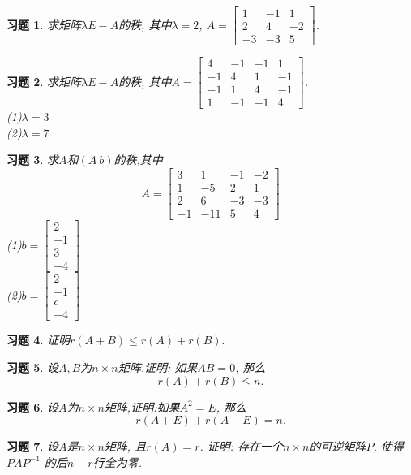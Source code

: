 \documentclass[a4paper]{book}
\newtheorem{ex}{习题}[chapter]
\begin{document}
\begin{ex}\label{4.21}
求矩阵$\lambda E-A$的秩, 其中$\lambda=2$, $A=\begin{bmatrix}1&-1&1\\2&4&-2\\-3&-3&5\end{bmatrix}$.
\end{ex}

\begin{ex}\label{4.22}
求矩阵$\lambda E-A$的秩, 其中$A=\begin{bmatrix}4&-1&-1&1\\-1&4&1&-1\\-1&1&4&-1\\1&-1&-1&4\end{bmatrix}$.\\
(1)$\lambda=3$\\
(2)$\lambda=7$
\end{ex}

\begin{ex}\label{4.23}
求$A$和$(A\ b)$的秩,其中
$$A=\begin{bmatrix}3&1&-1&-2\\1&-5&2&1\\2&6&-3&-3\\-1&-11&5&4\end{bmatrix}$$
(1)$b=\begin{bmatrix}2\\-1\\3\\-4\end{bmatrix}$ \\
(2)$b=\begin{bmatrix}2\\-1\\c\\-4\end{bmatrix}$
\end{ex}

\begin{ex}\label{4.24}
证明$r(A+B)\leq r(A)+r(B).$
\end{ex}

\begin{ex}\label{4.25}
设$A,B$为$n\times n$矩阵.证明: 如果$AB=0$, 那么$$r(A)+r(B)\leq n.$$
\end{ex}

\begin{ex}\label{4.26}
设$A$为$n\times n$矩阵,证明:如果$A^2=E$, 那么$$r(A+E)+r(A-E)=n.$$
\end{ex}

\begin{ex}\label{4.27}
设$A$是$n\times n$矩阵, 且$r(A)=r$. 证明: 存在一个$n\times n$的可逆矩阵$P$, 使得$PAP^{-1}$ 的后$n-r$行全为零.
\end{ex}
\end{document}
